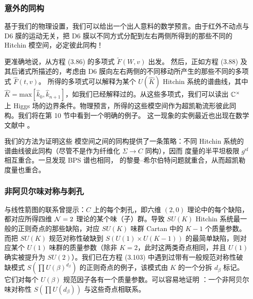 
\subsubsection{意外的同构}\label{sec:surprise}

基于我们的物理设置，我们可以给出一个出人意料的数学预言。由于红外不动点与 D6 膜的运动无关，把 D6 膜以不同方式分配到左右两侧所得到的那些不同的 Hitchin 模空间，必定彼此同构！

更准确地说，从方程 (3.86) 的多项式 $\tilde F(W,v)$ 出发。%
然后，正如方程 (3.88) 及其后诸式所描述的，考虑由 D6 膜向左右两侧的不同移动所产生的那些不同的多项式 $\hat F(t,v)$。%
所得的多项式可以解释为某个 $U(\hat K)$ Hitchin 系统的谱曲线，其中 $\hat K = \mathrm{max}[\hat k_0, \hat k_{n+1}]$，如我们已经解释过的。从这些多项式，我们可以读出 $\mathbb{C}^\times$ 上 Higgs 场的边界条件。物理预言，所得的这些模空间作为超凯勒流形彼此同构。我们将在第 10 节中看到一个明确的例子。%
这一现象的实例最近也出现在数学文献中 \cite{irkm}。

我们的方法为证明这些 \hk 模空间之间的同构提供了一条策略：不同 Hitchin 系统的谱曲线彼此同构（尽管不是作为纤维化 $\Sigma \to C$ 同构），因而 \hk 度量的半平坦极限 $g^{\mathrm{sf}}$ 相互重合。一旦发现 BPS 谱也相同，\cite{Gaiotto:2008cd} 的黎曼--希尔伯特问题就重合，从而超凯勒度量也重合。

\subsubsection{非阿贝尔味对称与刺孔}\label{sec:flavor}

与线性箭图的联系曾提示：$C$ 上的每个刺孔，即六维 $(2,0)$ 理论中的每个缺陷，都对应所得四维 $\mathcal{N}=2$ 理论的某个味（子）群。导致 $SU(K)$ Hitchin 系统最一般的正则奇点的那些缺陷，对应 $SU(K)$ 味群 Cartan 中的 $K-1$ 个质量参数。而把 $SU(K)$ 规范对称性破缺到 $S(U(1) \times U(K-1))$ 的最简单缺陷，则对应某个 $U(1)$ 味群的质量参数（除非 $K=2$，此时这两类奇点相同，并且 $U(1)$ 确实被提升为 $SU(2)$）。我们已在方程 (3.103) 中遇到过带有一般规范对称性破缺模式 $S(\prod U(\beta)^{d_\beta})$ 的正则奇点的例子，该模式由 $K$ 的一个分拆 $d_\beta$ 标记。%
它们对每个 $U(\beta)$ 规范因子各有一个质量参数。可以容易地证明 \cite{Gaiotto:2009we}：一个非阿贝尔味对称性 $S(\prod U(d_\beta))$ 与这些奇点相联系。

